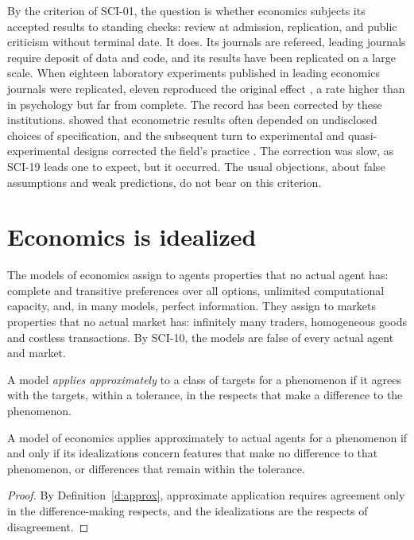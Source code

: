 \documentclass{situationist-preprint}
\begin{document}
By the criterion of SCI-01, the question is whether economics subjects its accepted results to standing checks: review at admission, replication, and public criticism without terminal date. It does. Its journals are refereed, leading journals require deposit of data and code, and its results have been replicated on a large scale. When eighteen laboratory experiments published in leading economics journals were replicated, eleven reproduced the original effect \citep{Camerer2016}, a rate higher than in psychology but far from complete. The record has been corrected by these institutions. \citet{Leamer1983} showed that econometric results often depended on undisclosed choices of specification, and the subsequent turn to experimental and quasi-experimental designs corrected the field's practice \citep{AngristPischke2010}. The correction was slow, as SCI-19 leads one to expect, but it occurred. The usual objections, about false assumptions and weak predictions, do not bear on this criterion.

\section{Economics is idealized}

The models of economics assign to agents properties that no actual agent has: complete and transitive preferences over all options, unlimited computational capacity, and, in many models, perfect information. They assign to markets properties that no actual market has: infinitely many traders, homogeneous goods and costless transactions. By SCI-10, the models are false of every actual agent and market.

\begin{definition}\label{d:approx}
A model \emph{applies approximately} to a class of targets for a phenomenon if it agrees with the targets, within a tolerance, in the respects that make a difference to the phenomenon.
\end{definition}

\begin{proposition}\label{p:range}
A model of economics applies approximately to actual agents for a phenomenon if and only if its idealizations concern features that make no difference to that phenomenon, or differences that remain within the tolerance.
\end{proposition}

\begin{proof}
By Definition~\ref{d:approx}, approximate application requires agreement only in the difference-making respects, and the idealizations are the respects of disagreement.
\end{proof}
\end{document}
